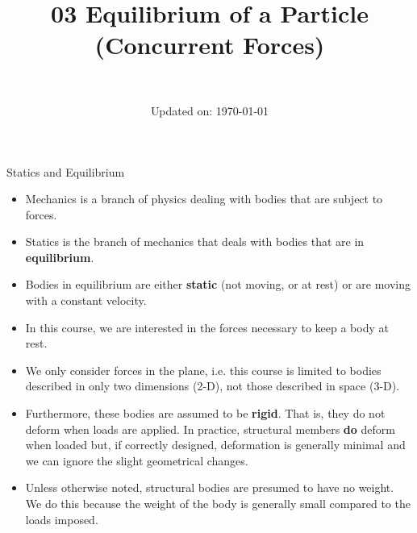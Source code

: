\documentclass[9pt, xcolor={svgnames, x11names},professionalfonts]{beamer}
\title[Equilibrium of a Particle / Concurrent Forces]{\Huge 03 Equilibrium of a Particle \\(Concurrent Forces)}
\subtitle[Engineering Statics]{\Large\textcolor{white}{Engineering Statics}}
\author{}
\date{\small Updated on: \today}
\begin{document}

\begin{frame}[plain]    %
	\titlepage
\end{frame}



\begin{frame}{Statics and Equilibrium}
	\small
	\begin{itemize}
		\item Mechanics is a branch of physics dealing with bodies that are subject to forces.
		\item Statics is the branch of mechanics that deals with bodies that are in {\bf equilibrium}.
		\item Bodies in equilibrium are either {\bf static} (not moving, or at rest) or are moving with a constant velocity.
		\item In this course, we are interested in the forces necessary to keep a body at rest.
		\item We only consider forces in the plane, i.e. this course is limited to bodies described in only two dimensions (2-D), not those described in space (3-D).
		\item Furthermore, these bodies are assumed to be {\bf rigid}. That is, they do not deform when loads are applied. In practice, structural members {\bf do} deform when loaded but, if correctly designed, deformation is generally minimal and we can ignore the slight geometrical changes.
		\item Unless otherwise noted, structural bodies are presumed to have no weight. We do this because the weight of the body is generally small compared to the loads imposed. %
	\end{itemize}

\end{frame}

\end{document}
